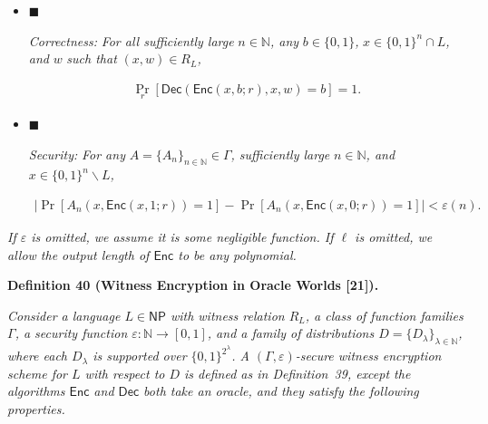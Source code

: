 \documentclass[10pt,a4paper]{article}
\begin{document}
\begin{itemize}


\item[] 
$\blacksquare$ 


\emph{Correctness:}\emph{ For all sufficiently large }$n\in\mathbb{N}$\emph{, any }$b\in\{0,1\}$\emph{, }$x\in\{0,1\}^{n}\cap L$\emph{, and }$w$\emph{ such that }$(x,w)\in R_{L}$\emph{,}\par


\[\begin{gathered}
\Pr_{r}\left[{\mathsf{Dec}}({\mathsf{Enc}}(x,b;r),x,w)=b\right]=1.
\end{gathered}\]





\item[] 
$\blacksquare$ 


\emph{Security:}\emph{ For any }$A=\{A_{n}\}_{n\in\mathbb{N}}\in\Gamma$\emph{, sufficiently large }$n\in\mathbb{N}$\emph{, and }$x\in\{0,1\}^{n}\backslash L$\emph{,}\par


\[\begin{gathered}
\left|\Pr[A_{n}(x,{\mathsf{Enc}}(x,1;r))=1]-\Pr[A_{n}(x,{\mathsf{Enc}}(x,0;r))=1]\right|<\varepsilon(n).
\end{gathered}\]





\end{itemize}


\emph{If $\varepsilon$ is omitted, we assume it is some negligible function. If $\ell$ is omitted, we allow the output length of ${\mathsf{Enc}}$ to be any polynomial.}\par







\par\medskip\noindent\textbf{
\textbf{Definition 40}\textbf{ }(Witness Encryption in Oracle Worlds [21])\textbf{.}
}\par



\emph{Consider a language $L\in{\mathsf{NP}}$ with witness relation $R_{L}$, a class of function families $\Gamma$, a security function $\varepsilon:\mathbb{N}\to[0,1]$, and a family of distributions $D=\{D_{\lambda}\}_{\lambda\in\mathbb{N}}$, where each $D_{\lambda}$ is supported over $\{0,1\}^{2^{\lambda}}$. A $(\Gamma,\varepsilon)$-secure witness encryption scheme for $L$ with respect to $D$ is defined as in Definition 39, except the algorithms ${\mathsf{Enc}}$ and ${\mathsf{Dec}}$ both take an oracle, and they satisfy the following properties.}\par
\end{document}
